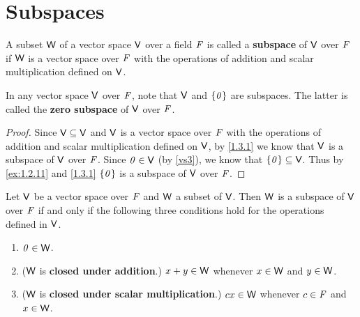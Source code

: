 \section{Subspaces}\label{sec:1.3}

\begin{defn}\label{1.3.1}
	A subset \(\mathsf{W}\) of a vector space \(\mathsf{V}\) over a field \(\mathit{F}\) is called a \textbf{subspace} of \(\mathsf{V}\) over \(\mathit{F}\) if \(\mathsf{W}\) is a vector space over \(\mathit{F}\) with the operations of addition and scalar multiplication defined on \(\mathsf{V}\).
\end{defn}

\begin{eg}\label{1.3.2}
	In any vector space \(\mathsf{V}\) over \(\mathit{F}\), note that \(\mathsf{V}\) and \(\left\lbrace\mathit{0}\right\rbrace\) are subspaces.
	The latter is called the \textbf{zero subspace} of \(\mathsf{V}\) over \(\mathit{F}\).
\end{eg}

\begin{proof}
	Since \(\mathsf{V} \subseteq \mathsf{V}\) and \(\mathsf{V}\) is a vector space over \(\mathit{F}\) with the operations of addition and scalar multiplication defined on \(\mathsf{V}\), by \cref{1.3.1} we know that \(\mathsf{V}\) is a subspace of \(\mathsf{V}\) over \(\mathit{F}\).
	Since \(\mathit{0} \in \mathsf{V}\) (by \ref{vs3}), we know that \(\left\lbrace\mathit{0}\right\rbrace \subseteq \mathsf{V}\).
	Thus by \cref{ex:1.2.11} and \cref{1.3.1} \(\left\lbrace\mathit{0}\right\rbrace\) is a subspace of \(\mathsf{V}\) over \(\mathit{F}\).
\end{proof}

\begin{thm}\label{1.3}
	Let \(\mathsf{V}\) be a vector space over \(\mathit{F}\) and \(\mathsf{W}\) a subset of \(\mathsf{V}\).
	Then \(\mathsf{W}\) is a subspace of \(\mathsf{V}\) over \(\mathit{F}\) if and only if the following three conditions hold for the operations defined in \(\mathsf{V}\).
	\begin{enumerate}
		\item \(\mathit{0} \in \mathsf{W}\).
		\item (\(\mathsf{W}\) is \textbf{closed under addition}.)
		      \(x + y \in \mathsf{W}\) whenever \(x \in \mathsf{W}\) and \(y \in \mathsf{W}\).
		\item (\(\mathsf{W}\) is \textbf{closed under scalar multiplication}.)
		      \(cx \in \mathsf{W}\) whenever \(c \in \mathit{F}\) and \(x \in \mathsf{W}\).
	\end{enumerate}
\end{thm}

